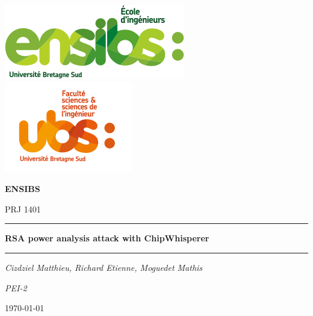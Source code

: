 \documentclass[a4paper,12pt]{article}
\begin{document}
\begin{titlepage}
  \vspace*{-2cm}
  \hspace*{-2cm}\includegraphics[scale=0.6]{../assets/img/logo_ensibs.png}
  \vspace*{-2cm}
  \hspace*{7cm}\includegraphics[scale=0.6]{../assets/img/logo_ubs.png}\par
  \vspace{4cm}
  \centering
  {\scshape\LARGE \textbf{ENSIBS} \par}

  \vspace{1cm}
  {\scshape\Large PRJ 1401 \par}
  \vspace{1cm}
  \rule{\linewidth}{0.4mm}\par %
  \vspace{1cm}
  {\huge\bfseries RSA power analysis attack with ChipWhisperer \par}
  \vspace{1cm}
  \rule{\linewidth}{0.4mm}\par %
  \par
  \vspace{1cm}
  {\Large\itshape Cizdziel Matthieu, Richard Etienne, Moguedet Mathis\par}
  \vspace{1cm}
  {\Large\itshape PEI-2\par}
  \vspace{3cm}
  \par
  \vfill
  {\large \today\par}
\end{titlepage}
\end{document}
